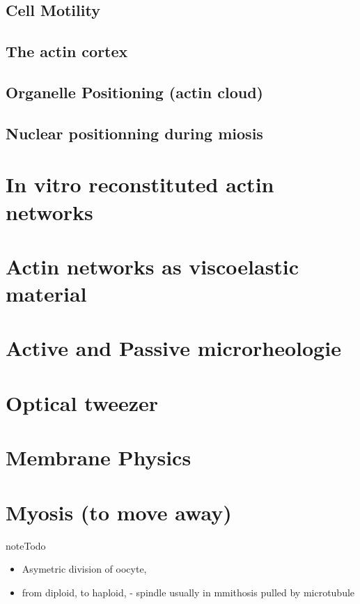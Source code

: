 \documentclass[A4paperpaper,11pt,english]{sphinxmanual}
\begin{document}
\subsection{Cell Motility}
\label{parts/part1:cell-motility}

\subsection{The actin cortex}
\label{parts/part1:the-actin-cortex}

\subsection{Organelle Positioning (actin cloud)}
\label{parts/part1:organelle-positioning-actin-cloud}

\subsection{Nuclear positionning during miosis}
\label{parts/part1:nuclear-positionning-during-miosis}

\section{In vitro reconstituted actin networks}
\label{parts/part1:in-vitro-reconstituted-actin-networks}

\section{Actin networks as viscoelastic material}
\label{parts/part1:actin-networks-as-viscoelastic-material}

\section{Active and Passive microrheologie}
\label{parts/part1:active-and-passive-microrheologie}

\section{Optical tweezer}
\label{parts/part1:optical-tweezer}

\section{Membrane Physics}
\label{parts/part1:membrane-physics}

\section{Myosis (to move away)}
\label{parts/part1:myosis-to-move-away}
\begin{notice}{note}{Todo}
\begin{itemize}
\item {} 
Asymetric division of oocyte,

\item {} 
from diploid, to haploid,
- spindle usually in mmithosis pulled by microtubule

\end{itemize}
\end{notice}
\end{document}
